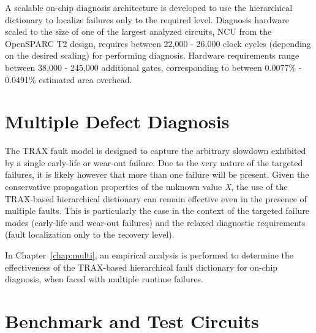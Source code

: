 A scalable on-chip diagnosis architecture is developed to use the hierarchical dictionary to localize failures only to the required level.
%
Diagnosis hardware scaled to the size of one of the largest analyzed circuits, NCU from the OpenSPARC T2 design, requires between 22,000 - 26,000 clock cycles (depending on the desired scaling) for performing diagnosis.
%
Hardware requirements range between 38,000 - 245,000 additional gates, corresponding to between 0.0077\% - 0.0491\% estimated area overhead.

\section{Multiple Defect Diagnosis}
\label{sec:intro_multi}

The TRAX fault model is designed to capture the arbitrary slowdown exhibited by a single early-life or wear-out failure.
%
Due to the very nature of the targeted failures, it is likely however that more than one failure will be present.
%
Given the conservative propagation properties of the unknown value \textit{X}, the use of the TRAX-based hierarchical dictionary can remain effective even in the presence of multiple faults.
%
This is particularly the case in the context of the targeted failure modes (early-life and wear-out failures) and the relaxed diagnostic requirements (fault localization only to the recovery level).

In Chapter~\ref{chap:multi}, an empirical analysis is performed to determine the effectiveness of the TRAX-based hierarchical fault dictionary for on-chip diagnosis, when faced with multiple runtime failures.

\section{Benchmark and Test Circuits}
\label{sec:intro_benchmark_and_test_circuits}

